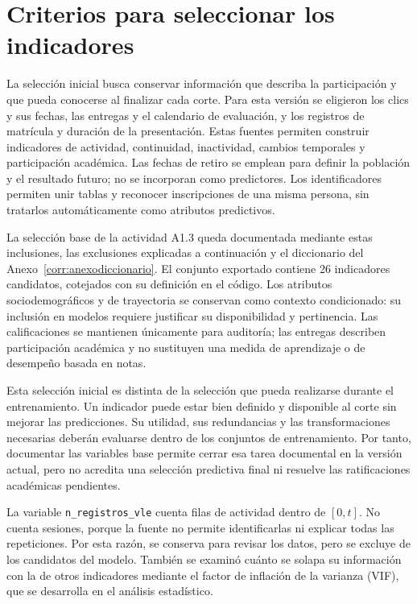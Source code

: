 \section{Criterios para seleccionar los indicadores}
\label{entrega:seleccionbase}
La selección inicial busca conservar información que describa la participación y que pueda conocerse al finalizar cada corte. Para esta versión se eligieron los clics y sus fechas, las entregas y el calendario de evaluación, y los registros de matrícula y duración de la presentación. Estas fuentes permiten construir indicadores de actividad, continuidad, inactividad, cambios temporales y participación académica. Las fechas de retiro se emplean para definir la población y el resultado futuro; no se incorporan como predictores. Los identificadores permiten unir tablas y reconocer inscripciones de una misma persona, sin tratarlos automáticamente como atributos predictivos.

La selección base de la actividad A1.3 queda documentada mediante estas inclusiones, las exclusiones explicadas a continuación y el diccionario del Anexo~\ref{corr:anexodiccionario}. El conjunto exportado contiene 26 indicadores candidatos, cotejados con su definición en el código. Los atributos sociodemográficos y de trayectoria se conservan como contexto condicionado: su inclusión en modelos requiere justificar su disponibilidad y pertinencia. Las calificaciones se mantienen únicamente para auditoría; las entregas describen participación académica y no sustituyen una medida de aprendizaje o de desempeño basada en notas.

Esta selección inicial es distinta de la selección que pueda realizarse durante el entrenamiento. Un indicador puede estar bien definido y disponible al corte sin mejorar las predicciones. Su utilidad, sus redundancias y las transformaciones necesarias deberán evaluarse dentro de los conjuntos de entrenamiento. Por tanto, documentar las variables base permite cerrar esa tarea documental en la versión actual, pero no acredita una selección predictiva final ni resuelve las ratificaciones académicas pendientes.

La variable \texttt{n\_registros\_vle} cuenta filas de actividad dentro de $[0,t]$. No cuenta sesiones, porque la fuente no permite identificarlas ni explicar todas las repeticiones. Por esta razón, se conserva para revisar los datos, pero se excluye de los candidatos del modelo. También se examinó cuánto se solapa su información con la de otros indicadores mediante el factor de inflación de la varianza (VIF), que se desarrolla en el análisis estadístico.

